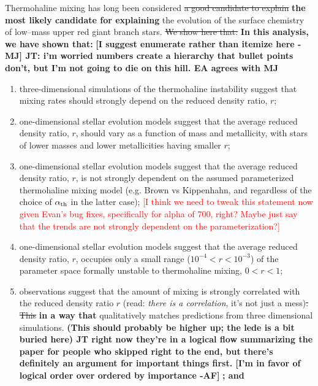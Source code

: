 %
%
%
Thermohaline mixing has long been considered \sout{a good candidate to explain} \textbf{the most likely candidate for explaining} the evolution of the surface chemistry of low--mass upper red giant branch stars. \sout{We show here that:} \textbf{In this analysis, we have shown that:}
\textbf{[I suggest enumerate rather than itemize here - MJ] JT: i'm worried numbers create a hierarchy that bullet points don't, but I'm not going to die on this hill. EA agrees with MJ}
\begin{enumerate}
    \item three-dimensional simulations of the thermohaline instability suggest that mixing rates should strongly depend on the reduced density ratio, $r$;
    
    \item one-dimensional stellar evolution models suggest that the average reduced density ratio, $r$, should vary as a function of mass and metallicity, with stars of lower masses and lower metallicities having smaller $r$;
    
    \item one-dimensional stellar evolution models suggest that the average reduced density ratio, $r$, is not strongly dependent on the assumed parameterized thermohaline mixing model (e.g. Brown vs Kippenhahn, and regardless of the choice of $\alpha_{\rm th}$ in the latter case); \textcolor{red}{[I think we need to tweak this statement now given Evan's bug fixes, specifically for alpha of 700, right? Maybe just say that the trends are not strongly dependent on the parameterization?]}
    
    \item one-dimensional stellar evolution models suggest that the average reduced density ratio, $r$, occupies only a small range ($10^{-4}<r<10^{-3}$) of the parameter space formally unstable to thermohaline mixing, $0<r<1$;
    
    \item observations suggest that the amount of mixing is strongly correlated with the reduced density ratio $r$ (read: \emph{there is a correlation}, it's not just a mess)\sout{. This} \textbf{in a way that} qualitatively matches predictions from three dimensional simulations. {\bf (This should probably be higher up; the lede is a bit buried here) JT right now they're in a logical flow summarizing the paper for people who skipped right to the end, but there's definitely an argument for important things first. [I'm in favor of logical order over ordered by importance -AF]} \textbf{; and}
    

\end{enumerate}
